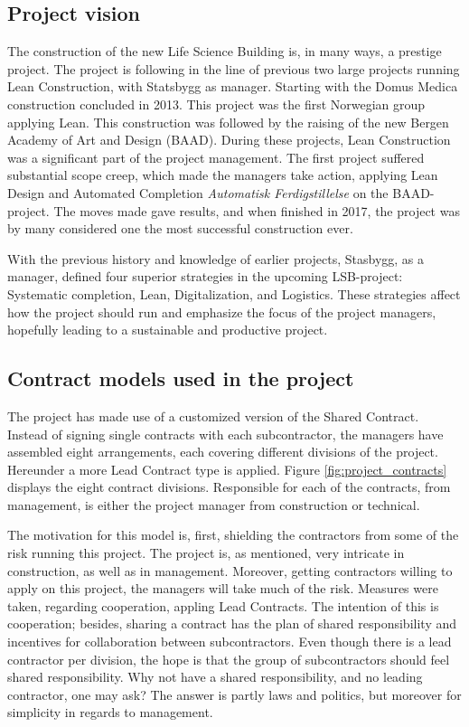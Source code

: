 \subsection*{Project vision}
The construction of the new Life Science Building is, in many ways, a prestige project. The project is following in the line of previous two large projects running Lean Construction, with Statsbygg as manager. Starting with the Domus Medica construction concluded in 2013. This project was the first Norwegian group applying Lean. This construction was followed by the raising of the new Bergen Academy of Art and Design (BAAD). During these projects, Lean Construction was a significant part of the project management. The first project suffered substantial scope creep, which made the managers take action, applying Lean Design and Automated Completion \textit{Automatisk Ferdigstillelse} on the BAAD-project. The moves made gave results, and when finished in 2017, the project was by many considered one the most successful construction ever. 

With the previous history and knowledge of earlier projects, Stasbygg, as a manager, defined four superior strategies in the upcoming LSB-project: Systematic completion, Lean, Digitalization, and Logistics. These strategies affect how the project should run and emphasize the focus of the project managers, hopefully leading to a sustainable and productive project. 

\subsection*{Contract models used in the project}
The project has made use of a customized version of the Shared Contract. Instead of signing single contracts with each subcontractor, the managers have assembled eight arrangements, each covering different divisions of the project. Hereunder a more Lead Contract type is applied. Figure \ref{fig:project_contracts} displays the eight contract divisions. Responsible for each of the contracts, from management, is either the project manager from construction or technical. 

The motivation for this model is, first, shielding the contractors from some of the risk running this project. The project is, as mentioned, very intricate in construction, as well as in management. Moreover, getting contractors willing to apply on this project, the managers will take much of the risk. Measures were taken, regarding cooperation, appling Lead Contracts. The intention of this is cooperation; besides, sharing a contract has the plan of shared responsibility and incentives for collaboration between subcontractors. Even though there is a lead contractor per division, the hope is that the group of subcontractors should feel shared responsibility. Why not have a shared responsibility, and no leading contractor, one may ask? The answer is partly laws and politics, but moreover for simplicity in regards to management.


